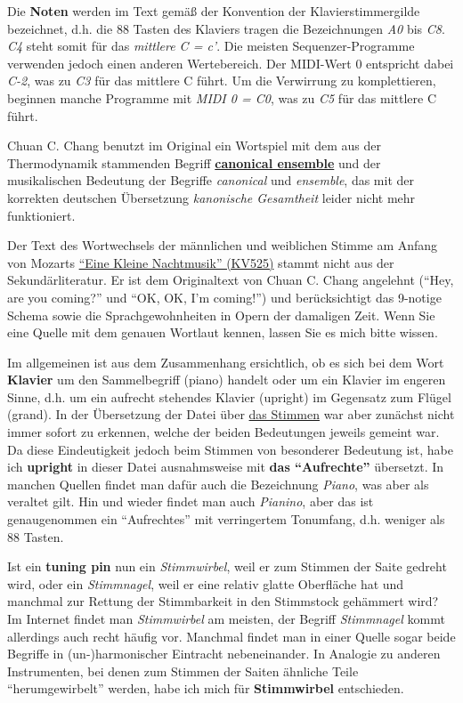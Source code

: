 \hypertarget{Noten}{}

Die \textbf{Noten} werden im Text gemäß der Konvention der Klavierstimmergilde bezeichnet, d.h. die 88 Tasten des Klaviers tragen die Bezeichnungen \textit{A0} bis \textit{C8}.
\textit{C4} steht somit für das \textit{mittlere C = c'}.
Die meisten Sequenzer-Programme verwenden jedoch einen anderen Wertebereich.
Der MIDI-Wert 0 entspricht dabei \textit{C-2}, was zu \textit{C3} für das mittlere C führt.
Um die Verwirrung zu komplettieren, beginnen manche Programme mit \textit{MIDI 0 = C0}, was zu \textit{C5} für das mittlere C führt.


\hypertarget{ueb-canonic}{}
Chuan C. Chang benutzt im Original ein Wortspiel mit dem aus der Thermodynamik stammenden Begriff \hyperlink{canonic}{\textbf{canonical ensemble}} und der musikalischen Bedeutung der Begriffe \textit{canonical} und \textit{ensemble}, das mit der korrekten deutschen Übersetzung \textit{kanonische Gesamtheit} leider nicht mehr funktioniert.


\hypertarget{ueb-KV525}{}
Der Text des Wortwechsels der männlichen und weiblichen Stimme am Anfang von Mozarts \hyperlink{KV525}{\enquote{Eine Kleine Nachtmusik} (KV525)} stammt nicht aus der Sekundärliteratur.
Er ist dem Originaltext von Chuan C. Chang angelehnt (\enquote{Hey, are you coming?} und \enquote{OK, OK, I'm coming!}) und berücksichtigt das 9-notige Schema sowie die Sprachgewohnheiten in Opern der damaligen Zeit.
Wenn Sie eine Quelle mit dem genauen Wortlaut kennen, lassen Sie es mich bitte wissen.


\hypertarget{upright}{}
Im allgemeinen ist aus dem Zusammenhang ersichtlich, ob es sich bei dem Wort \textbf{Klavier} um den Sammelbegriff (piano) handelt oder um ein Klavier im engeren Sinne, d.h. um ein aufrecht stehendes Klavier (upright) im Gegensatz zum Flügel (grand).
In der Übersetzung der Datei über \hyperlink{c2_1}{das Stimmen} war aber zunächst nicht immer sofort zu erkennen, welche der beiden Bedeutungen jeweils gemeint war.
Da diese Eindeutigkeit jedoch beim Stimmen von besonderer Bedeutung ist, habe ich \textbf{upright} in dieser Datei ausnahmsweise mit \textbf{das \enquote{Aufrechte}} übersetzt.
In manchen Quellen findet man dafür auch die Bezeichnung \textit{Piano}, was aber als veraltet gilt.
Hin und wieder findet man auch \textit{Pianino}, aber das ist genaugenommen ein \enquote{Aufrechtes} mit verringertem Tonumfang, d.h. weniger als 88 Tasten.


\hypertarget{pin}{}
Ist ein \textbf{tuning pin} nun ein \textit{Stimmwirbel}, weil er zum Stimmen der Saite gedreht wird, oder ein \textit{Stimmnagel}, weil er eine relativ glatte Oberfläche hat und manchmal zur Rettung der Stimmbarkeit in den Stimmstock gehämmert wird?
Im Internet findet man \textit{Stimmwirbel} am meisten, der Begriff \textit{Stimmnagel} kommt allerdings auch recht häufig vor.
Manchmal findet man in einer Quelle sogar beide Begriffe in (un-)harmonischer Eintracht nebeneinander.
In Analogie zu anderen Instrumenten, bei denen zum Stimmen der Saiten ähnliche Teile \enquote{herumgewirbelt} werden, habe ich mich für \textbf{Stimmwirbel} entschieden. 


